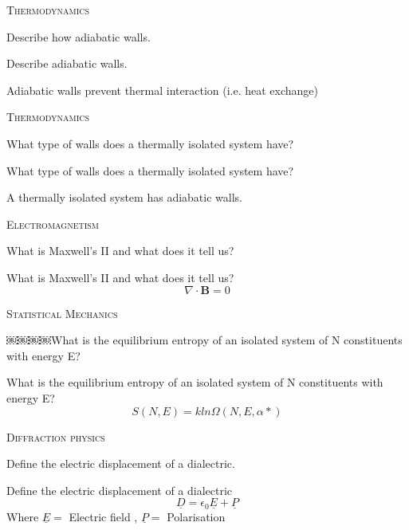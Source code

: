 \documentclass{article}
\newenvironment{flashcard}[2][]{%
\noindent   \textsc{#1}
\vfill
\centerline{{\noindent  \Large{#2}}}
\vfill
\newpage
\noindent  
}
{\newpage}
\begin{document}

\begin{flashcard}[Thermodynamics]{Describe how adiabatic walls.}

Describe adiabatic walls.

Adiabatic walls prevent thermal interaction (i.e. heat exchange) 
\end{flashcard}


\begin{flashcard}[Thermodynamics]{What type of walls does a thermally isolated system have?}

What type of walls does a thermally
 isolated system have?

A thermally isolated system has adiabatic walls.
\end{flashcard}


\begin{flashcard}[Electromagnetism]{What is Maxwell's II  and what does it tell us?}
What is Maxwell's II and what does it tell us?
$$\nabla \cdot \mathbf{B} = 0$$
\end{flashcard}


\begin{flashcard}[Statistical Mechanics]{￼￼￼￼What is the equilibrium entropy of an isolated system of N constituents with energy E? }
What is the equilibrium entropy of an isolated system of N constituents with energy E?
$$S(N, E) = k ln \Omega(N, E, {\alpha*})$$

\end{flashcard}


\begin{flashcard}[Diffraction physics]{Define the electric displacement of a dialectric.}
Define the electric displacement of a dialectric
$$\underline{D}=\epsilon_0 \underline{E}+\underline{P}$$
Where $ \underline{E}=$ Electric field , $\underline{P}=$ Polarisation

\end{flashcard}
\end{document}
